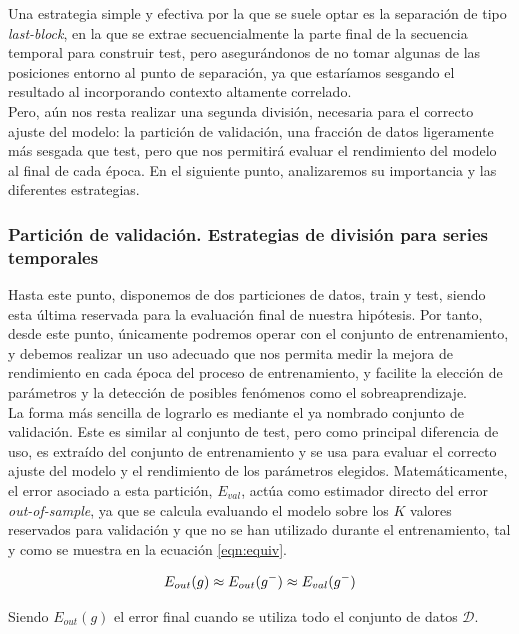 Una estrategia simple y efectiva por la que se suele optar es la separación de tipo \textit{last-block}, en la que se extrae secuencialmente la parte final de la secuencia temporal para construir test, pero asegurándonos de no tomar algunas de las posiciones entorno al punto de separación, ya que estaríamos sesgando el resultado al incorporando contexto altamente correlado.\\

Pero, aún nos resta realizar una segunda división, necesaria para el correcto ajuste del modelo: la partición de validación, una fracción de datos ligeramente más sesgada que test, pero que nos permitirá evaluar el rendimiento del modelo al final de cada época. En el siguiente punto, analizaremos su importancia y las diferentes estrategias.

\subsubsection{Partición de validación. Estrategias de división para series temporales}

Hasta este punto, disponemos de dos particiones de datos, train y test, siendo esta última reservada para la evaluación final de nuestra hipótesis. Por tanto, desde este punto, únicamente podremos operar con el conjunto de entrenamiento, y debemos realizar un uso adecuado que nos permita medir la mejora de rendimiento en cada época del proceso de entrenamiento, y facilite la elección de parámetros y la detección de posibles fenómenos como el sobreaprendizaje.\\

La forma más sencilla de lograrlo es mediante el ya nombrado conjunto de validación. Este es similar al conjunto de test, pero como principal diferencia de uso, es extraído del conjunto de entrenamiento y se usa para evaluar el correcto ajuste del modelo y el rendimiento de los parámetros elegidos. Matemáticamente, el error asociado a esta partición, $E_{val}$, actúa como estimador directo del error \textit{out-of-sample}, ya que se calcula evaluando el modelo sobre los $K$ valores reservados para validación y que no se han utilizado durante el entrenamiento, tal y como se muestra en la ecuación \ref{eqn:equiv}.

\begin{equation}
	\label{eqn:equiv}
	\centering
	E_{out}(g) \approx E_{out}(g^-) \approx E_{val}(g^-)
\end{equation}


Siendo $E_{out}(g)$ el error final cuando se utiliza todo el conjunto de datos $\mathcal D$.\\

